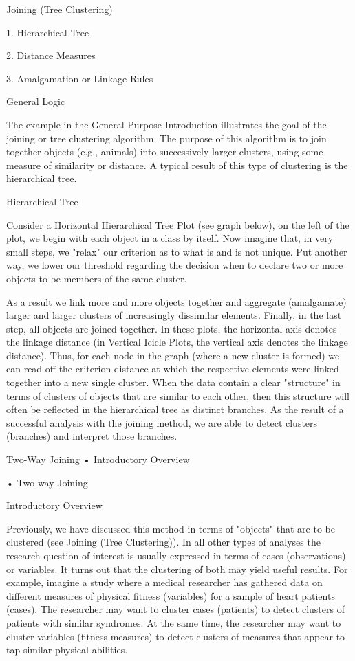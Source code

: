  


Joining (Tree Clustering)

1.
Hierarchical Tree

2.
Distance Measures

3.
Amalgamation or Linkage Rules


General Logic


The example in the General Purpose Introduction illustrates the goal of the joining or tree clustering algorithm. The purpose of this algorithm is to join together objects (e.g., animals) into successively larger clusters, using some measure of similarity or distance. A typical result of this type of clustering is the hierarchical tree.

Hierarchical Tree


Consider a Horizontal Hierarchical Tree Plot (see graph below), on the left of the plot, we begin with each object in a class by itself. Now imagine that, in very small steps, we "relax" our criterion as to what is and is not unique. Put another way, we lower our threshold regarding the decision when to declare two or more objects to be members of the same cluster.



As a result we link more and more objects together and aggregate (amalgamate) larger and larger clusters of increasingly dissimilar elements. Finally, in the last step, all objects are joined together. In these plots, the horizontal axis denotes the linkage distance (in Vertical Icicle Plots, the vertical axis denotes the linkage distance). Thus, for each node in the graph (where a new cluster is formed) we can read off the criterion distance at which the respective elements were linked together into a new single cluster. When the data contain a clear "structure" in terms of clusters of objects that are similar to each other, then this structure will often be reflected in the hierarchical tree as distinct branches. As the result of a successful analysis with the joining method, we are able to detect clusters (branches) and interpret those branches.

 


Two-Way Joining
•
Introductory Overview

•
Two-way Joining


Introductory Overview

Previously, we have discussed this method in terms of "objects" that are to be clustered (see Joining (Tree Clustering)). In all other types of analyses the research question of interest is usually expressed in terms of cases (observations) or variables. It turns out that the clustering of both may yield useful results. For example, imagine a study where a medical researcher has gathered data on different measures of physical fitness (variables) for a sample of heart patients (cases). The researcher may want to cluster cases (patients) to detect clusters of patients with similar syndromes. At the same time, the researcher may want to cluster variables (fitness measures) to detect clusters of measures that appear to tap similar physical abilities.

